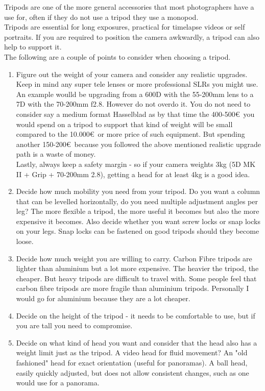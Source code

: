 Tripods are one of the more general accessories that most photographers have a use for, often if they do not use a tripod they use a monopod.
\\
Tripods are essential for long \glspl{exposure}, practical for \gls{timelapse} videos or self portraits. If you are required to position the camera awkwardly, a tripod can also help to support it.
\\[\baselineskip]
The following are a couple of points to consider when choosing a tripod.
\begin{enumerate}[i]
	\item Figure out the weight of your camera and consider any realistic upgrades.
	\\
	Keep in mind any super tele lenses or more professional SLRs you might use. An example woulld be upgrading from a 600D with the 55-200mm lens to a 7D with the 70-200mm f2.8. However do not overdo it. You do not need to consider say a medium format Hasselblad as by that time the 400-500\euro\ you would spend on a tripod to support that kind of weight will be small compared to the 10.000\euro\ or more price of such equipment. But spending another 150-200\euro\ because you followed the above mentioned realistic upgrade path is a waste of money. 
\\
Lastly, always keep a safety margin - so if your camera weights 3kg (5D MK II + Grip + 70-200mm 2.8), getting a head for at least 4kg is a good idea.
  \item Decide how much mobility you need from your tripod. Do you want a column that can be levelled horizontally, do you need multiple adjustment angles per leg? The more flexible a tripod, the more useful it becomes but also the more expensive it becomes. Also decide whether you want screw locks or snap locks on your legs. Snap locks can be fastened on good tripods should they become loose.
	\item Decide how much weight you are willing to carry. Carbon Fibre tripods are lighter than aluminium but a lot more expensive. The heavier the tripod, the cheaper. But heavy tripods are difficult to travel with.
Some people feel that carbon fibre tripods are more fragile than aluminium tripods. Personally I would go for aluminium because they are a lot cheaper.
	\item Decide on the height of the tripod - it needs to be comfortable to use, but if you are tall you need to compromise.
	\item Decide on what kind of head you want and consider that the head also has a weight limit just as the tripod.
	\subitem A video head for fluid movement?
	\subitem An "old fashioned" head for exact orientation (useful for panoramas).
	\subitem A ball head, easily quickly adjusted, but does not allow consistent changes,  such as one would use for a panorama.
\end{enumerate}

